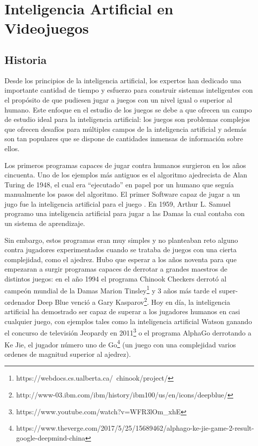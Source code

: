 \section{Inteligencia Artificial en Videojuegos}
\subsection{Historia}
Desde los principios de la inteligencia artificial, los expertos han dedicado una importante cantidad de tiempo y esfuerzo para construir sistemas inteligentes con el propósito de que pudiesen jugar a juegos con un nivel igual o superior al humano. Este enfoque en el estudio de los juegos se debe a que ofrecen un campo de estudio ideal para la inteligencia artificial: los juegos son problemas complejos que ofrecen desafíos para múltiples campos de la inteligencia artificial y además son tan populares que se dispone de cantidades inmensas de información sobre ellos\cite{ai_and_games}.

Los primeros programas capaces de jugar contra humanos surgieron en los años cincuenta. Uno de los ejemplos más antiguos es el algoritmo ajedrecista de Alan Turing de 1948\cite{turing_chess}, el cual era ``ejecutado'' en papel por un humano que seguía manualmente los pasos del algoritmo. El primer Software capaz de jugar a un jugo fue la inteligencia artificial para el juego . En 1959, Arthur L. Samuel\cite{machine_learning} programo una inteligencia artificial para jugar a las Damas la cual contaba con un sistema de aprendizaje. 

Sin embargo, estos programas eran muy simples y no planteaban reto alguno contra jugadores experimentados cuando se trataba de juegos con una cierta complejidad, como el ajedrez. Hubo que esperar a los años noventa para que empezaran a surgir programas capaces de derrotar a grandes maestros de distintos juegos: en el año 1994 el programa Chinook Checkers derrotó al campeón mundial de la Damas Marion Tinsley\footnote{https://webdocs.cs.ualberta.ca/~chinook/project/} y 3 años más tarde el super-ordenador Deep Blue venció a Gary Kasparov\footnote{http://www-03.ibm.com/ibm/history/ibm100/us/en/icons/deepblue/}. Hoy en día, la inteligencia artificial ha demostrado ser capaz de superar a los jugadores humanos en casi cualquier juego, con ejemplos tales como la inteligencia artificial Watson ganando el concurso de televisión Jeopardy en 2011\footnote{https://www.youtube.com/watch?v=WFR3lOm\_xhE} o el programa AlphaGo derrotando a Ke Jie, el jugador número uno de Go\footnote{https://www.theverge.com/2017/5/25/15689462/alphago-ke-jie-game-2-result-google-deepmind-china} (un juego con una complejidad varios ordenes de magnitud superior al ajedrez).

